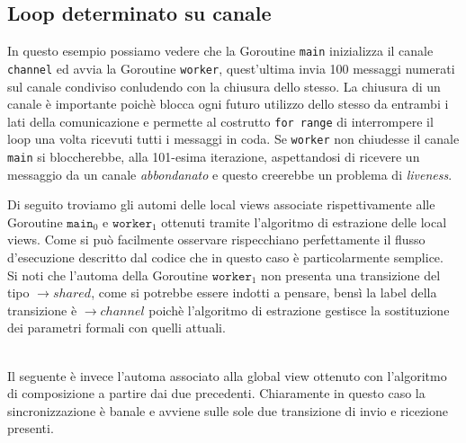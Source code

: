 \subsection{Loop determinato su canale}
In questo esempio possiamo vedere che la Goroutine \texttt{main} inizializza il canale \texttt{channel} ed avvia la Goroutine \texttt{worker}, quest'ultima invia 100 messaggi numerati sul canale condiviso conludendo con la chiusura dello stesso. La chiusura di un canale è importante poichè blocca ogni futuro utilizzo dello stesso da entrambi i lati della comunicazione e permette al costrutto \texttt{for range} di interrompere il loop una volta ricevuti tutti i messaggi in coda. Se \texttt{worker} non chiudesse il canale \texttt{main} si bloccherebbe, alla 101-esima iterazione, aspettandosi di ricevere un messaggio da un canale \emph{abbondanato} e questo creerebbe un problema di \emph{liveness}.
\newpage %

\bigskip
Di seguito troviamo gli automi delle local views associate rispettivamente alle Goroutine $\texttt{main}_0$ e $\texttt{worker}_1$ ottenuti tramite l'algoritmo di estrazione delle local views. Come si può facilmente osservare rispecchiano perfettamente il flusso d'esecuzione descritto dal codice che in questo caso è particolarmente semplice.\\
Si noti che l'automa della Goroutine $\texttt{worker}_1$ non presenta una transizione del tipo $\rightarrow shared$, come si potrebbe essere indotti a pensare, bensì la label della transizione è $  \rightarrow channel$ poichè l'algoritmo di estrazione gestisce la sostituzione dei parametri formali con quelli attuali.
\begin{figure}[h!]
    \centering
\end{figure} \bigskip \\
Il seguente è invece l'automa associato alla global view ottenuto con l'algoritmo di composizione a partire dai due precedenti. Chiaramente in questo caso la sincronizzazione è banale e avviene sulle sole due transizione di invio e ricezione presenti.
\begin{figure}[h!]
    \centering
\end{figure}


